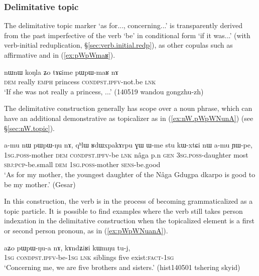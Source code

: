   \subsubsection{Delimitative topic} \label{sec:delimitative}
The delimitative topic marker  `as for..., concerning...' is transparently derived from the past imperfective of the verb `be' in conditional form `if it was...' (with verb-initial reduplication, §\ref{sec:verb.initial.redp}), as other copulas such as affirmative  and  in (\ref{ex:pWpWmaʁ}).

\begin{exe}
\ex \label{ex:pWpWmaʁ}
\gll nɯnɯ koŋla ʑo tɤɕime pɯ\redp{}pɯ-maʁ nɤ \\
\textsc{dem} really \textsc{emph} princess \textsc{cond}\redp{}\textsc{pst}.\textsc{ipfv}-not.be \textsc{lnk} \\
\glt `If she was not really a princess, ...' (140519 wandou gongzhu-zh) 
\end{exe}

The delimitative construction generally has scope over a noun phrase, which can have an additional demonstrative  as topicalizer as in (\ref{ex:nW.pWpWNunA}) (see §\ref{sec:nW.topic}).

\begin{exe}
\ex \label{ex:nW.pWpWNunA}
\gll a-mu nɯ pɯ\redp{}pɯ-ŋu nɤ, qʰlɯ ʁdɯxpakɤrpu ɣɯ ɯ-me stu kɯ-xtɕi nɯ a-mu ɲɯ-pe, \\
\textsc{1sg}.\textsc{poss}-mother \textsc{dem} \textsc{cond}\redp{}\textsc{pst}.\textsc{ipfv}-be \textsc{lnk} nâga p.n \textsc{gen} \textsc{3sg}.\textsc{poss}-daughter most \textsc{sbj}:\textsc{pcp}-be.small \textsc{dem} \textsc{1sg}.\textsc{poss}-mother \textsc{sens}-be.good \\
\glt `As for my mother, the youngest daughter of the Nâga Gdugpa dkarpo is good to be my mother.' (Gesar)
\end{exe}

In this construction, the verb is in the process of becoming grammaticalized as a topic particle. It is possible to find examples where the verb still takes person indexation in the delimitative construction when the topicalized element is a first or second person pronoun, as in (\ref{ex:pWpWNuanA}). 

\begin{exe}
\ex \label{ex:pWpWNuanA}
\gll aʑo pɯ\redp{}pɯ-ŋu-a nɤ, kɤndʑiʁi kɯmŋu tu-j, \\
\textsc{1sg} \textsc{cond}\redp{}\textsc{pst}.\textsc{ipfv}-be-\textsc{1sg} \textsc{lnk} siblings five exist:\textsc{fact}-\textsc{1sg} \\
\glt `Concerning me, we are five brothers and sisters.' (hist140501 tshering skyid) 	
\end{exe}

